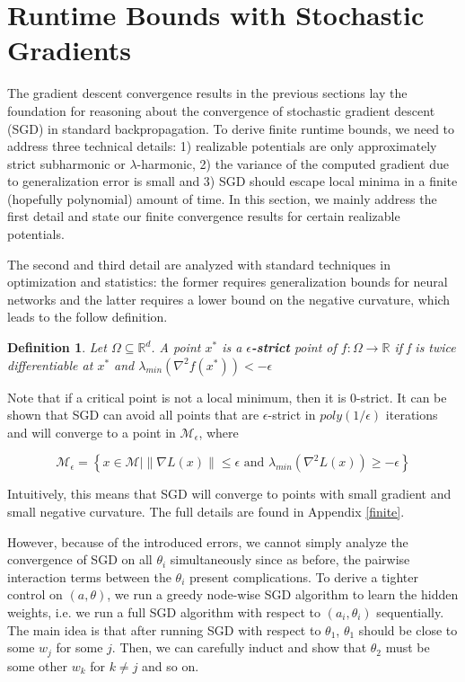 \documentclass[11pt]{article}
\newtheorem{definition}[theorem]{Definition}
\newcommand{\R}{{\mathbb{R}}}
\begin{document}
 
\section{Runtime Bounds with Stochastic Gradients}

The gradient descent convergence results in the previous sections lay the foundation for reasoning about the convergence of stochastic gradient descent (SGD) in standard backpropagation. To derive finite runtime bounds, we need to address three technical details: 1) realizable potentials are only approximately strict subharmonic or $\lambda$-harmonic, 2) the variance of the computed gradient due to generalization error is small and 3) SGD should escape local minima in a finite (hopefully polynomial) amount of time. In this section, we mainly address the first detail and state our finite convergence results for certain realizable potentials. 

The second and third detail are analyzed with standard techniques in optimization and statistics: the former requires generalization bounds for neural networks and the latter requires a lower bound on the negative curvature, which leads to the follow definition.

\begin{definition} Let $\Omega \subseteq \R^d$. A point $x^*$ is a {\bf $\epsilon$-strict} point of $f : \Omega \to \R$ if f is twice differentiable at $x^*$ and $\lambda_{min}(\nabla^2f(x^*)) < -\epsilon$
\end{definition}

Note that if a critical point is not a local minimum, then it is $0$-strict. It can be shown that SGD can avoid all points that are $\epsilon$-strict in $poly(1/\epsilon)$ iterations and will converge to a point in $\mathcal{M}_\epsilon$, where

\[\mathcal{M}_\epsilon = \left\{x\in \mathcal{M} \Big| \|\nabla L(x)\| \leq \epsilon \text{ and } \lambda_{min}(\nabla^2 L(x)) \geq -\epsilon\right\}\]

Intuitively, this means that SGD will converge to points with small gradient and small negative curvature. The full details are found in Appendix \ref{finite}. 

However, because of the introduced errors, we cannot simply analyze the convergence of SGD on all $\theta_i$ simultaneously since as before, the pairwise interaction terms between the $\theta_i$ present complications. To derive a tighter control on $(a,\theta)$, we run a greedy node-wise SGD algorithm to learn the hidden weights, i.e. we run a full SGD algorithm with respect to $(a_i,\theta_i)$ sequentially. The main idea is that after running SGD with respect to $\theta_1$, $\theta_1$ should be close to some $w_j$ for some $j$. Then, we can carefully induct and show that $\theta_2$ must be some other $w_k$ for $k\neq j$ and so on.
\end{document}
